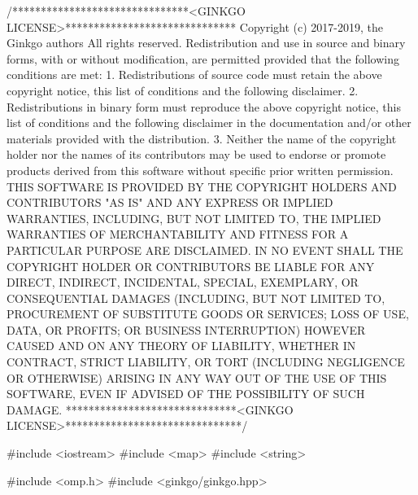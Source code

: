 \begin{DoxyCodeInclude}
\textcolor{comment}{/*******************************<GINKGO LICENSE>******************************}
\textcolor{comment}{Copyright (c) 2017-2019, the Ginkgo authors}
\textcolor{comment}{All rights reserved.}
\textcolor{comment}{}
\textcolor{comment}{Redistribution and use in source and binary forms, with or without}
\textcolor{comment}{modification, are permitted provided that the following conditions}
\textcolor{comment}{are met:}
\textcolor{comment}{}
\textcolor{comment}{1. Redistributions of source code must retain the above copyright}
\textcolor{comment}{notice, this list of conditions and the following disclaimer.}
\textcolor{comment}{}
\textcolor{comment}{2. Redistributions in binary form must reproduce the above copyright}
\textcolor{comment}{notice, this list of conditions and the following disclaimer in the}
\textcolor{comment}{documentation and/or other materials provided with the distribution.}
\textcolor{comment}{}
\textcolor{comment}{3. Neither the name of the copyright holder nor the names of its}
\textcolor{comment}{contributors may be used to endorse or promote products derived from}
\textcolor{comment}{this software without specific prior written permission.}
\textcolor{comment}{}
\textcolor{comment}{THIS SOFTWARE IS PROVIDED BY THE COPYRIGHT HOLDERS AND CONTRIBUTORS "AS}
\textcolor{comment}{IS" AND ANY EXPRESS OR IMPLIED WARRANTIES, INCLUDING, BUT NOT LIMITED}
\textcolor{comment}{TO, THE IMPLIED WARRANTIES OF MERCHANTABILITY AND FITNESS FOR A}
\textcolor{comment}{PARTICULAR PURPOSE ARE DISCLAIMED. IN NO EVENT SHALL THE COPYRIGHT}
\textcolor{comment}{HOLDER OR CONTRIBUTORS BE LIABLE FOR ANY DIRECT, INDIRECT, INCIDENTAL,}
\textcolor{comment}{SPECIAL, EXEMPLARY, OR CONSEQUENTIAL DAMAGES (INCLUDING, BUT NOT}
\textcolor{comment}{LIMITED TO, PROCUREMENT OF SUBSTITUTE GOODS OR SERVICES; LOSS OF USE,}
\textcolor{comment}{DATA, OR PROFITS; OR BUSINESS INTERRUPTION) HOWEVER CAUSED AND ON ANY}
\textcolor{comment}{THEORY OF LIABILITY, WHETHER IN CONTRACT, STRICT LIABILITY, OR TORT}
\textcolor{comment}{(INCLUDING NEGLIGENCE OR OTHERWISE) ARISING IN ANY WAY OUT OF THE USE}
\textcolor{comment}{OF THIS SOFTWARE, EVEN IF ADVISED OF THE POSSIBILITY OF SUCH DAMAGE.}
\textcolor{comment}{******************************<GINKGO LICENSE>*******************************/}

\textcolor{preprocessor}{#include <iostream>}
\textcolor{preprocessor}{#include <map>}
\textcolor{preprocessor}{#include <string>}


\textcolor{preprocessor}{#include <omp.h>}
\textcolor{preprocessor}{#include <ginkgo/ginkgo.hpp>}



\end{DoxyCodeInclude}
